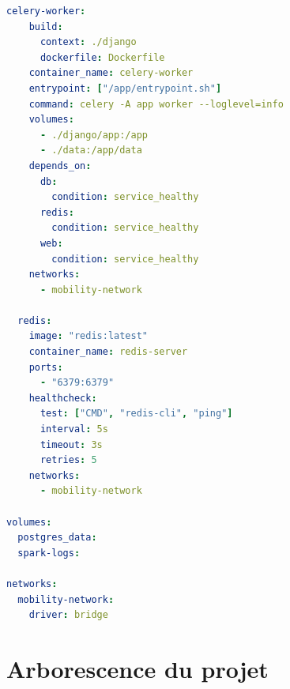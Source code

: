 \documentclass[french]{tai_info} %
\begin{document}
\begin{lstlisting}[language=yaml, basicstyle=\tiny\ttfamily, breaklines=true, frame=single, caption={docker-compose.yml}]
  celery-worker:
    build:
      context: ./django
      dockerfile: Dockerfile
    container_name: celery-worker
    entrypoint: ["/app/entrypoint.sh"]
    command: celery -A app worker --loglevel=info
    volumes:
      - ./django/app:/app
      - ./data:/app/data
    depends_on:
      db:
        condition: service_healthy
      redis:
        condition: service_healthy
      web:
        condition: service_healthy
    networks:
      - mobility-network

  redis:
    image: "redis:latest"
    container_name: redis-server
    ports:
      - "6379:6379"
    healthcheck:
      test: ["CMD", "redis-cli", "ping"]
      interval: 5s
      timeout: 3s
      retries: 5
    networks:
      - mobility-network

volumes:
  postgres_data:
  spark-logs:

networks:
  mobility-network:
    driver: bridge
\end{lstlisting}

\section{Arborescence du projet}
\end{document}
